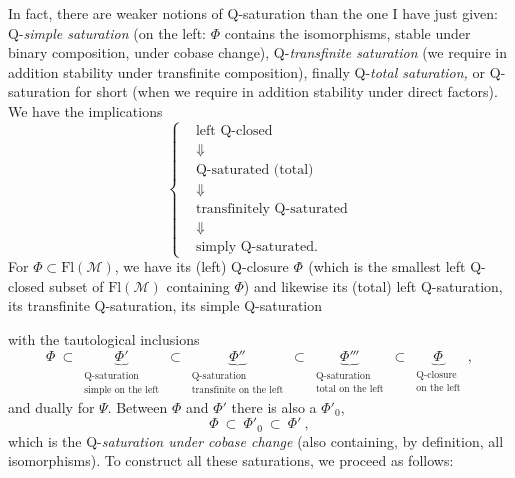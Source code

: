 \documentclass[11pt]{article}
\newcommand{\printedpage}[1]{\marginpar{\footnotesize p.~#1}}
\newcommand{\msp}[1]{\marginpar{\footnotesize [#1]}}
\newcommand{\tld}{\tilde{}}   %
\begin{document}
In fact, there are weaker notions of Q-saturation than the one I have just given: Q-\textit{simple saturation} (on the left: $\Phi$ contains the isomorphisms, stable under binary composition, under cobase change), Q-\textit{transfinite saturation} (we require in addition stability under transfinite composition), finally Q-\textit{total saturation,} or Q-saturation for short (when we require in addition stability under direct factors). We have the implications
\[
\left\{
\begin{aligned}
&\text{left Q-closed}\\
&\Downarrow\\
&\text{Q-saturated (total)}\\
&\Downarrow\\
&\text{transfinitely Q-saturated}\\
&\Downarrow\\
&\text{simply Q-saturated.}
\end{aligned}
\right.
\tag*{(1.6)}
\]
For $\Phi \subset \mathrm{Fl}(\mathcal{M})$, we have its (left) Q-closure $\Phi^{\tld}$ (which is the smallest left Q-closed subset of $\mathrm{Fl}(\mathcal{M})$ containing $\Phi$) and likewise its (total) left Q-saturation, its transfinite Q-saturation, its simple Q-saturation

\msp{page 4}

with the tautological inclusions
\[
\Phi \ \subset \
\underbrace{\Phi'}_{\substack{\text{Q-saturation}\\ \text{simple on the left}}}
\ \subset \
\underbrace{\Phi''}_{\substack{\text{Q-saturation}\\ \text{transfinite on the left}}}
\ \subset \
\underbrace{\Phi'''}_{\substack{\text{Q-saturation}\\ \text{total on the left}}}
\ \subset \
\underbrace{\Phi^{\tld}}_{\substack{\text{Q-closure}\\ \text{on the left}}}
\ ,
\tag*{(1.7)}
\]
and dually for $\Psi$. Between $\Phi$ and $\Phi'$ there is also a $\Phi'_0$,
\[
\Phi \ \subset \ \Phi'_0 \ \subset \ \Phi'\ ,
\tag*{(1.8)}
\]
which is the Q-\textit{saturation under cobase change} (also containing, by definition, all isomorphisms). To construct all these saturations, we proceed as follows:

\newpage

\printedpage{3}
\end{document}
